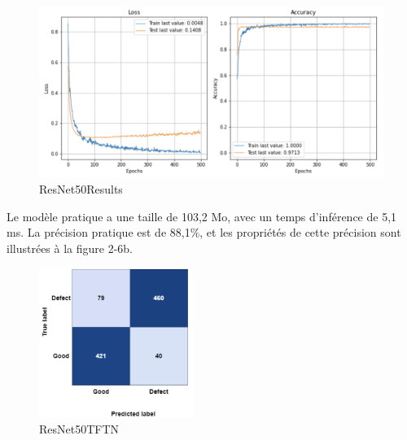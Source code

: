     \begin{figure}[h]
        \centering
        \includegraphics[width=13cm]{assets/PartTwo/ChapterTwo/ResNet50Results.png}
        \caption{ResNet50Results}
        \label{ResNet50Results}
        \end{figure}

Le modèle pratique a une taille de 103,2 Mo, avec un temps d'inférence de 5,1 ms. La précision pratique est de 88,1\%, et les propriétés de cette précision sont illustrées à la figure 2-6b. 
\begin{figure}[h]
    \centering
    \includegraphics[width=5cm]{assets/PartTwo/ChapterTwo/ResNet50TFTN.png}
    \caption{ResNet50TFTN}
    \label{ResNet50TFTN}
    \end{figure}
\newpage


